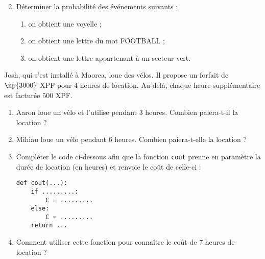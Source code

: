 \documentclass[a4paper,dvipsnames]{article}
\begin{document}
\begin{enumerate}
  \setcounter{enumi}{1}
  \item Déterminer la probabilité des événements suivants :
  \begin{enumerate}
    \item \og{}on obtient une voyelle\fg{} ;
    \item \og{}on obtient une lettre du mot \textsc{FOOTBALL}\fg{} ;
    \item \og{}on obtient une lettre appartenant à un secteur vert\fg{}.
  \end{enumerate}
\end{enumerate}

\bigskip

\exo[3 points] Josh, qui s'est installé à Moorea, loue des vélos. Il propose un forfait de $\np{3000}$ XPF pour $4$ heures de location. Au-delà, chaque heure supplémentaire est facturée $500$ XPF.
\begin{enumerate}
  \item Aaron loue un vélo et l'utilise pendant $3$ heures. Combien paiera-t-il la location ?
  \item Mihiau loue un vélo pendant $6$ heures. Combien paiera-t-elle la location ?
  \item Compléter le code ci-dessous afin que la fonction \texttt{cout} prenne en paramètre la durée de location (en heures) et renvoie le coût de celle-ci :
    \begin{verbatim}
def cout(...):
    if .........:
        C = .........
    else:
        C = .........
    return ...
    \end{verbatim}
  \item Comment utiliser cette fonction pour connaître le coût de $7$ heures de location ?
\end{enumerate}
\end{document}
